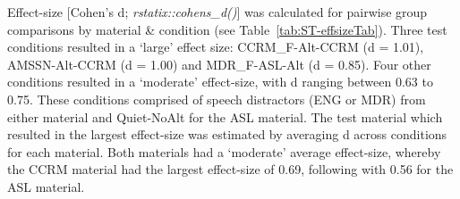 \documentclass[a4paper, twoside]{templates/ociamthesis}
\begin{document}
\hfill\break
Effect-size {[}Cohen's d; \emph{rstatix::cohens\_d()}{]} was calculated for pairwise group comparisons by material \& condition (see Table~\ref{tab:ST-effsizeTab}). Three test conditions resulted in a `large' effect size: CCRM\_F-Alt-CCRM (d = 1.01), AMSSN-Alt-CCRM (d = 1.00) and MDR\_F-ASL-Alt (d = 0.85). Four other conditions resulted in a `moderate' effect-size, with d ranging between 0.63 to 0.75. These conditions comprised of speech distractors (ENG or MDR) from either material and Quiet-NoAlt for the ASL material. The test material which resulted in the largest effect-size was estimated by averaging d across conditions for each material. Both materials had a `moderate' average effect-size, whereby the CCRM material had the largest effect-size of 0.69, following with 0.56 for the ASL material.\\

\begin{table}

\caption{\label{tab:ST-effsizeTab}Cohen's d by condition and material.}
\centering
{}
\end{table}
\end{document}
